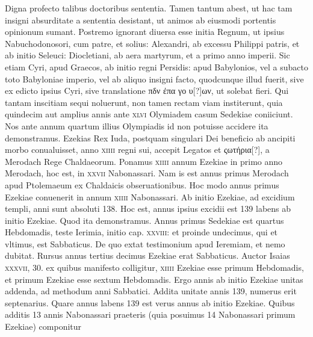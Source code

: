 Digna profecto
talibus doctoribus sententia.
Tamen tantum abest, ut hac tam insigni
absurditate a sententia desistant, ut animos ab eiusmodi portentis
opinionum sumant.
Postremo ignorant diuersa esse initia Regnum,
ut ipsius Nabuchodonosori, cum patre, et solius: Alexandri,
ab excessu Philippi patris, et ab initio Seleuci: Diocletiani, ab aera
martyrum, et a primo anno imperii.
Sic etiam Cyri, apud Graecos, ab
initio regni Persidis: apud Babylonios, vel a subacto toto Babyloniae
imperio, vel ab aliquo insigni facto, quodcunque illud fuerit, sive
ex edicto ipsius Cyri, sive translatione \textgreek{πδν ἐπα γο υ[?]ων},
ut solebat fieri.
Qui tantam inscitiam sequi noluerunt, non tamen rectam viam
institerunt, quia quindecim aut amplius annis ante \textsc{xlvi} Olymiadem
casum Sedekiae coniiciunt.
Nos ante annum quartum illius
Olympiadis id non potuisse accidere ita demonstramus. 
Ezekias
Rex Iuda, postquam singulari Dei beneficio ab ancipiti morbo conualuisset,
anno \textsc{xiiii} regni sui, accepit Legatos et \textgreek{ςωτήρια[?]}, a
Merodach Rege Chaldaeorum.
Ponamus \textsc{xiiii} annum Ezekiae in
primo anno Merodach, hoc est, in \textsc{xxvii} Nabonassari.
Nam is est
annus primus Merodach apud Ptolemaeum ex Chaldaicis obseruationibus. 
Hoc modo annus primus Ezekiae conuenerit in annum
\textsc{xiiii} Nabonassari.
Ab initio Ezekiae, ad excidium templi, anni
sunt absoluti 138.
Hoc est, annus ipsius excidii est 139 labens ab initio
Ezekiae.
Quod ita demonstramus. 
Annus primus Sedekiae est
quartus Hebdomadis, teste Ierimia, initio cap. \textsc{xxviii}: et proinde
undecimus, qui et vltimus, est Sabbaticus. 
De quo extat testimonium
apud Ieremiam, et nemo dubitat.
Rursus annus tertius decimus
Ezekiae erat Sabbaticus. 
Auctor Isaias \textsc{xxxvii}, 30.
 ex quibus
manifesto colligitur, \textsc{xiiii} Ezekiae esse primum Hebdomadis, et primum
Ezekiae esse sextum Hebdomadis. 
Ergo annis ab initio Ezekiae unitas addenda, ad methodum anni Sabbatici.
Addita unitate annis
139, numerus erit septenarius. 
Quare annus labens 139 est verus
annus ab initio Ezekiae.
Quibus additis 13 annis Nabonassari praeteris
(quia posuimus 14 Nabonassari primum Ezekiae) componitur
